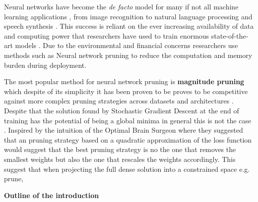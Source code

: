 
    Neural networks have become the \textit{de facto} model for many if not
    all machine learning applications \cite{lecunDeepLearning2015}, from  image
    recognition \cite{tanEfficientNetRethinkingModel2020} to  natural language
    processing \cite{devlinBERTPretrainingDeep2019} and  
    speech synthesis \cite{oordWaveNetGenerativeModel2016}. This success is
    reliant on the ever increasing availability of data and computing power
    that researchers have used to train enormous state-of-the-art models
    \cite{brownLanguageModelsAre2020}. Due to the environmental and financial
    concerns \cite{thompsonComputationalLimitsDeep2020} researchers use methods
    such as Neural network pruning to reduce the computation and memory burden
    during deployment.

    The most popular method for neural network pruning is \textbf{magnitude
    pruning}  which despite of its simplicity  it has been proven to be proves to be competitive against more complex pruning
    strategies across datasets and architectures
    \cite{guptaComplexityRequiredNeural2022}. Despite that the solution found
    by Stochastic Gradient Descent at the end of training has the potential of
    being a global minima \cite{leeGradientDescentOnly2016,luDepthCreatesNo2017,
    zhouSGDConvergesGlobal2018,kawaguchiDeepLearningPoor2016} in general this
    is not the case \cite{dingSubOptimalLocalMinima2020}. Inspired by
    the intuition of the Optimal
Brain Surgeon \cite{hassibiSecondOrderDerivatives1992}
    where they suggested that an pruning strategy based on a quadratic
    approximation of the loss function would suggest that the best pruning
    strategy is no the one that removes the smallest weights but also the one
    that rescales the weights accordingly. This
    suggest that when projecting the full dense solution into a constrained
    space e.g. prune,

\vspace{3cm}
\textbf{Outline of the  introduction}

